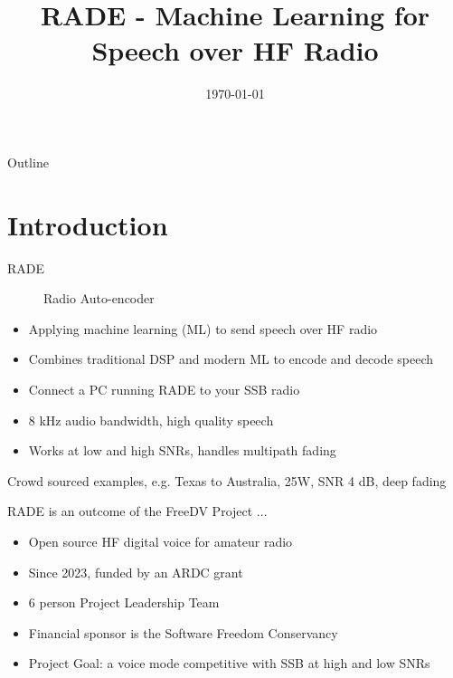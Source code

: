 \documentclass{beamer}
\title[RADE]{RADE - Machine Learning for Speech over HF Radio}
\institute[freedv.org]{freedv.org \and Supported by a grant from Amateur Radio Digital Communications}
\date[]{\today}
\begin{document}


\begin{frame}
    \titlepage
\end{frame}

\begin{frame}{Outline}
    \tableofcontents
\end{frame}

\section{Introduction}

\begin{frame}
\begin{description}
    \item[RADE] Radio Auto-encoder
\end{description}
\begin{itemize}
   \item Applying machine learning (ML) to send speech over HF radio 
   \item Combines traditional DSP and modern ML to encode and decode speech
   \item Connect a PC running RADE to your SSB radio
   \item 8 kHz audio bandwidth, high quality speech
   \item Works at low and high SNRs, handles multipath fading
\end{itemize}
\end{frame}

\begin{frame}
Crowd sourced examples, e.g. Texas to Australia, 25W, SNR 4 dB, deep fading
\href{http://freedv.org/davids-freedv-update-september-2024/}{}
\end{frame}

\begin{frame}
RADE is an outcome of the FreeDV Project ...
\begin{itemize}
    \item Open source HF digital voice for amateur radio
    \item Since 2023, funded by an ARDC grant
    \item 6 person Project Leadership Team
    \item Financial sponsor is the Software Freedom Conservancy
    \item Project Goal: a voice mode competitive with SSB at high and low SNRs
\end{itemize}
\end{frame}
\end{document}
